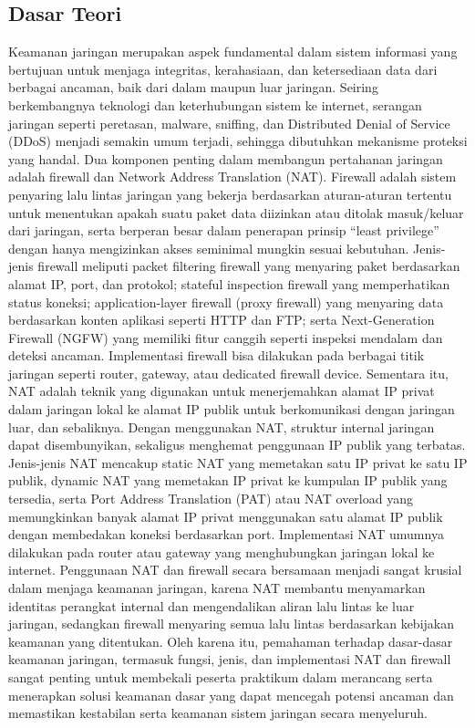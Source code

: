 \subsection{Dasar Teori}
Keamanan jaringan merupakan aspek fundamental dalam sistem informasi yang bertujuan untuk menjaga integritas, kerahasiaan, dan ketersediaan data dari berbagai ancaman, baik dari dalam maupun luar jaringan. Seiring berkembangnya teknologi dan keterhubungan sistem ke internet, serangan jaringan seperti peretasan, malware, sniffing, dan Distributed Denial of Service (DDoS) menjadi semakin umum terjadi, sehingga dibutuhkan mekanisme proteksi yang handal. Dua komponen penting dalam membangun pertahanan jaringan adalah firewall dan Network Address Translation (NAT). Firewall adalah sistem penyaring lalu lintas jaringan yang bekerja berdasarkan aturan-aturan tertentu untuk menentukan apakah suatu paket data diizinkan atau ditolak masuk/keluar dari jaringan, serta berperan besar dalam penerapan prinsip “least privilege” dengan hanya mengizinkan akses seminimal mungkin sesuai kebutuhan. Jenis-jenis firewall meliputi packet filtering firewall yang menyaring paket berdasarkan alamat IP, port, dan protokol; stateful inspection firewall yang memperhatikan status koneksi; application-layer firewall (proxy firewall) yang menyaring data berdasarkan konten aplikasi seperti HTTP dan FTP; serta Next-Generation Firewall (NGFW) yang memiliki fitur canggih seperti inspeksi mendalam dan deteksi ancaman. Implementasi firewall bisa dilakukan pada berbagai titik jaringan seperti router, gateway, atau dedicated firewall device. Sementara itu, NAT adalah teknik yang digunakan untuk menerjemahkan alamat IP privat dalam jaringan lokal ke alamat IP publik untuk berkomunikasi dengan jaringan luar, dan sebaliknya. Dengan menggunakan NAT, struktur internal jaringan dapat disembunyikan, sekaligus menghemat penggunaan IP publik yang terbatas. Jenis-jenis NAT mencakup static NAT yang memetakan satu IP privat ke satu IP publik, dynamic NAT yang memetakan IP privat ke kumpulan IP publik yang tersedia, serta Port Address Translation (PAT) atau NAT overload yang memungkinkan banyak alamat IP privat menggunakan satu alamat IP publik dengan membedakan koneksi berdasarkan port. Implementasi NAT umumnya dilakukan pada router atau gateway yang menghubungkan jaringan lokal ke internet. Penggunaan NAT dan firewall secara bersamaan menjadi sangat krusial dalam menjaga keamanan jaringan, karena NAT membantu menyamarkan identitas perangkat internal dan mengendalikan aliran lalu lintas ke luar jaringan, sedangkan firewall menyaring semua lalu lintas berdasarkan kebijakan keamanan yang ditentukan. Oleh karena itu, pemahaman terhadap dasar-dasar keamanan jaringan, termasuk fungsi, jenis, dan implementasi NAT dan firewall sangat penting untuk membekali peserta praktikum dalam merancang serta menerapkan solusi keamanan dasar yang dapat mencegah potensi ancaman dan memastikan kestabilan serta keamanan sistem jaringan secara menyeluruh.

